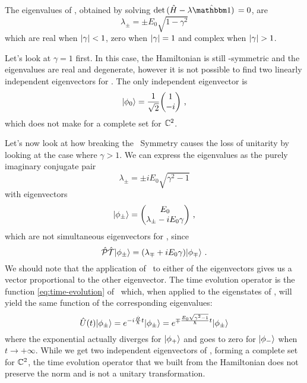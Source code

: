         The eigenvalues of \hH, obtained by solving $\det\pqty*{\hH - \lambda\hidM} = 0$, are
        \begin{equation*}
            \lambda_\pm = \pm E_0 \sqrt{1-\gamma^2}
        \end{equation*}
        which are real when $\abs{\gamma} < 1$, zero when $\abs{\gamma} = 1$ and complex when $\abs{\gamma} > 1$.
        
        Let's look at $\gamma = 1$ first. In this case, the Hamiltonian is still \PT-symmetric and the eigenvalues are real and degenerate, however it is not possible to find two linearly independent eigenvectors for \hH. The only independent eigenvector is
        \begin{equation*}
            \ket{\phi_0} = \frac{1}{\sqrt{2}}\! \pmqty{1 \\ -i}
            \mycomma
        \end{equation*}
        which does not make for a complete set for $\mathbb{C}^2$.

        Let's now look at how breaking the \PT\ Symmetry causes the loss of unitarity by looking at the case where $\gamma > 1$. We can express the eigenvalues as the purely imaginary conjugate pair
        \begin{equation*}
            \lambda_\pm = \pm i E_0 \sqrt{\gamma^2 - 1}
        \end{equation*}
        with eigenvectors
        \begin{equation*}
            \ket{\phi_\pm} = \pmqty{E_0 \\ \lambda_\pm - i E_0 \gamma }
            \mycomma
        \end{equation*}
        which are not simultaneous eigenvectors for \hPT, since
        \begin{equation*}
            \hPT\!\ket{\phi_\pm} = \pqty{\lambda_\mp + i E_0 \gamma}\!\ket{\phi_\mp}
            \myperiod
        \end{equation*}
        We should note that the application of \hPT\ to either of the eigenvectors gives us a vector proportional to the other eigenvector. The time evolution operator is the function \eqref{eq:time-evolution} of \hH\ which, when applied to the eigenstates of \hH, will yield the same function of the corresponding eigenvalues:
        \begin{equation*}
            \hU\pqty{t}\!\ket{\phi_\pm}
            = \myexp{-i\frac{\hH}{\hbar}t}\!\ket{\phi_\pm}
            = \myexp{\mp\frac{E_0\sqrt{\gamma^2-1}}{\hbar}t}\!\ket{\phi_\pm}
        \end{equation*}
        where the exponential actually diverges for $\ket{\phi_+}$ and goes to zero for $\ket{\phi_-}$ when $t\to +\infty$. While we get two independent eigenvectors of \hH, forming a complete set for $\mathbb{C}^2$, the time evolution operator that we built from the Hamiltonian does not preserve the norm and is not a unitary transformation.

